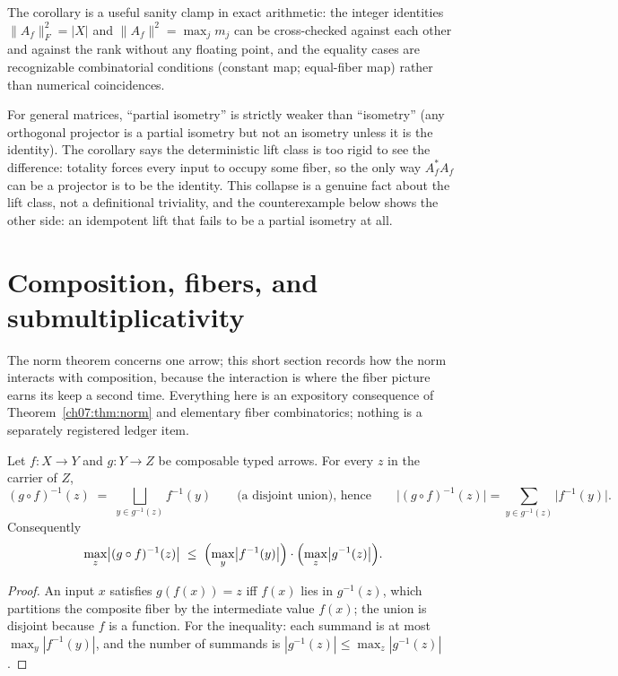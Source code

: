 The corollary is a useful sanity clamp in exact arithmetic: the integer
identities $\lVert A_f\rVert_F^2=|X|$ and
$\lVert A_f\rVert^2=\max_j m_j$ can be cross-checked against each other and
against the rank without any floating point, and the equality cases are
recognizable combinatorial conditions (constant map; equal-fiber map)
rather than numerical coincidences.

\begin{remark}
For general matrices, ``partial isometry'' is strictly weaker than
``isometry'' (any orthogonal projector is a partial isometry but not an
isometry unless it is the identity). The corollary says the deterministic
lift class is too rigid to see the difference: totality forces every input
to occupy some fiber, so the only way $A_f^*A_f$ can be a projector is to be
the identity. This collapse is a genuine fact about the lift class, not a
definitional triviality, and the counterexample below shows the other side:
an idempotent lift that fails to be a partial isometry at all.
\end{remark}

\section{Composition, fibers, and submultiplicativity}\label{ch07:sec:composition}

The norm theorem concerns one arrow; this short section records how the
norm interacts with composition, because the interaction is where the
fiber picture earns its keep a second time. Everything here is an
expository consequence of Theorem~\ref{ch07:thm:norm} and elementary fiber
combinatorics; nothing is a separately registered ledger item.

\begin{proposition}\label{ch07:prop:fibercomp}
Let $f:X\to Y$ and $g:Y\to Z$ be composable typed arrows. For every $z$ in
the carrier of $Z$,
\[
(g\circ f)^{-1}(z)\;=\;\bigsqcup_{y\in g^{-1}(z)} f^{-1}(y)
\qquad\text{(a disjoint union), hence}\qquad
\bigl|(g\circ f)^{-1}(z)\bigr|=\sum_{y\in g^{-1}(z)}\bigl|f^{-1}(y)\bigr| .
\]
Consequently
\[
\max_z\bigl|(g\circ f)^{-1}(z)\bigr|
\;\le\;
\Bigl(\max_y\bigl|f^{-1}(y)\bigr|\Bigr)\cdot
\Bigl(\max_z\bigl|g^{-1}(z)\bigr|\Bigr).
\]
\end{proposition}

\begin{proof}
An input $x$ satisfies $g(f(x))=z$ iff $f(x)$ lies in $g^{-1}(z)$, which
partitions the composite fiber by the intermediate value $f(x)$; the union
is disjoint because $f$ is a function. For the inequality: each summand is
at most $\max_y|f^{-1}(y)|$, and the number of summands is
$|g^{-1}(z)|\le\max_z|g^{-1}(z)|$.
\end{proof}

